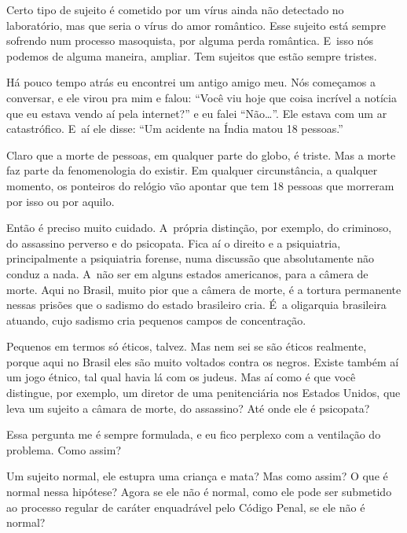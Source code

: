  

Certo tipo de sujeito é cometido por um vírus ainda não detectado no
laboratório, mas que seria o vírus do amor romântico. Esse sujeito
está sempre sofrendo num processo masoquista, por alguma perda
romântica. E~isso nós podemos de alguma maneira, ampliar. Tem
sujeitos que estão sempre tristes.

 

Há pouco tempo atrás eu encontrei um antigo amigo meu. Nós começamos a
conversar, e ele virou pra mim e falou: ``Você viu hoje que coisa
incrível a notícia que eu estava vendo aí pela internet?'' e eu falei
``Não…''. Ele estava com um ar catastrófico. E~aí ele disse: ``Um
acidente na Índia matou 18 pessoas.''

 

Claro que a morte de pessoas, em qualquer parte do globo, é triste. Mas
a morte faz parte da fenomenologia do existir. Em qualquer
circunstância, a qualquer momento, os ponteiros do relógio vão apontar
que tem 18 pessoas que morreram por isso ou por aquilo.

 

Então é preciso muito cuidado. A~própria distinção, por exemplo, do
criminoso, do assassino perverso e do psicopata. Fica aí o direito e a
psiquiatria, principalmente a psiquiatria forense, numa discussão que
absolutamente não conduz a nada. A~não ser em alguns estados americanos,
para a câmera de morte. Aqui no Brasil, muito pior que a câmera de
morte, é a tortura permanente nessas prisões que o sadismo do estado
brasileiro cria. É~a oligarquia brasileira atuando, cujo sadismo cria
pequenos campos de concentração.

 

Pequenos em termos só éticos, talvez. Mas nem sei se são éticos
realmente, porque aqui no Brasil eles são muito voltados contra os
negros. Existe também aí um jogo étnico, tal qual havia lá com os
judeus. Mas aí como é que você distingue, por exemplo, um diretor de uma
penitenciária nos Estados Unidos, que leva um sujeito a câmara de morte,
do assassino? Até onde ele é psicopata?

 

Essa pergunta me é sempre formulada, e eu fico perplexo com a ventilação
do problema. Como assim?

 

Um sujeito normal, ele estupra uma criança e mata? Mas como assim? O que
é normal nessa hipótese? Agora se ele não é normal, como ele pode ser
submetido ao processo regular de caráter enquadrável pelo Código Penal,
se ele não é normal?

